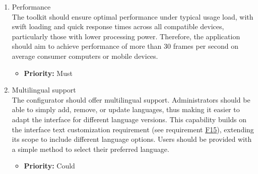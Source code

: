 \begin{enumerate}[label=\textbf{NF\arabic*:}, leftmargin=*]
\item Performance
\vspace{2pt}
\\The toolkit should ensure optimal performance under typical usage load, with swift loading and quick response times across all compatible devices, particularly those with lower processing power. Therefore, the application should aim to achieve performance of more than 30 frames per second on average consumer computers or mobile devices.
\begin{itemize}[noitemsep, label=\trianglebullet]
    \item \textbf{Priority:} Must
\end{itemize}
\vspace{4pt}

\item \label{itm:NF8} Multilingual support
\vspace{2pt}
\\The configurator should offer multilingual support. Administrators should be able to simply add, remove, or update languages, thus making it easier to adapt the interface for different language versions. This capability builds on the interface text customization requirement (see requirement \hyperref[itm:F15]{F15}), extending its scope to include different language options. Users should be provided with a simple method to select their preferred language.
\begin{itemize}[noitemsep, label=\trianglebullet]
    \item \textbf{Priority:} Could
\end{itemize}
\vspace{4pt}

\end{enumerate}